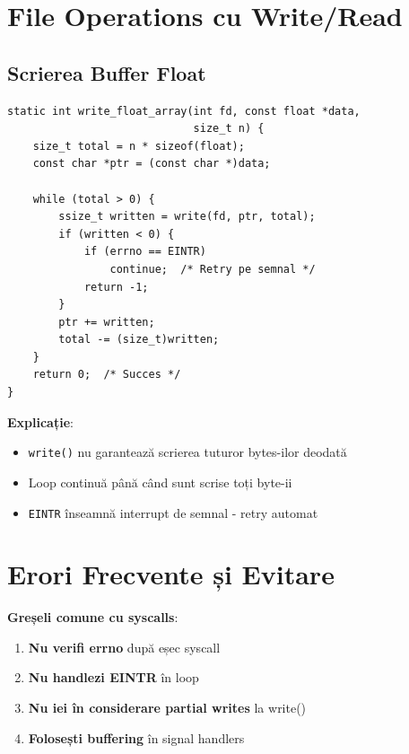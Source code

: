 \documentclass[12pt,a4paper,oneside]{book}
\newcommand{\warningbox}[1]{
\begin{tcolorbox}[colback=yellow!10,colframe=orange,title=\textbf{Atenție}]
#1
\end{tcolorbox}
}
\begin{document}
\section{File Operations cu Write/Read}

\subsection{Scrierea Buffer Float}

\begin{lstlisting}[caption=Scriere sigură de date float]
static int write_float_array(int fd, const float *data, 
                             size_t n) {
    size_t total = n * sizeof(float);
    const char *ptr = (const char *)data;
    
    while (total > 0) {
        ssize_t written = write(fd, ptr, total);
        if (written < 0) {
            if (errno == EINTR)
                continue;  /* Retry pe semnal */
            return -1;
        }
        ptr += written;
        total -= (size_t)written;
    }
    return 0;  /* Succes */
}
\end{lstlisting}

\textbf{Explicație}:
\begin{itemize}
    \item \texttt{write()} nu garantează scrierea tuturor bytes-ilor deodată
    \item Loop continuă până când sunt scrise toți byte-ii
    \item \texttt{EINTR} înseamnă interrupt de semnal - retry automat
\end{itemize}

\section{Erori Frecvente și Evitare}

\warningbox{
\textbf{Greșeli comune cu syscalls}:
\begin{enumerate}
    \item \textbf{Nu verifi errno} după eșec syscall
    \item \textbf{Nu handlezi EINTR} în loop
    \item \textbf{Nu iei în considerare partial writes} la write()
    \item \textbf{Folosești buffering} în signal handlers
\end{enumerate}
}

\newpage

\end{document}
